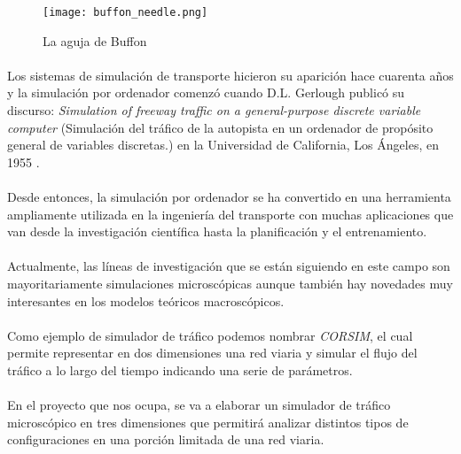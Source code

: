 	\begin{figure}[ht]
		\centering
			\texttt{[image: buffon\_needle.png]}
		\caption{La aguja de Buffon}
		\label{fig:AgujaBuffon}
	\end{figure}
	
	\paragraph{}	
	Los sistemas de simulación de transporte hicieron su aparición hace cuarenta años y la simulación por ordenador comenzó cuando D.L. Gerlough publicó su discurso: \emph{Simulation of freeway traffic on a general-purpose discrete variable computer} (Simulación del tráfico de la autopista en un ordenador de propósito general de variables discretas.) en la Universidad de California, Los Ángeles, en 1955 \cite{Kallberg1971}.
	
	\paragraph{}
	Desde entonces, la simulación por ordenador se ha convertido en una herramienta ampliamente utilizada en la ingeniería del transporte con muchas aplicaciones que van desde la investigación científica hasta la planificación y el entrenamiento.
	
	
	\paragraph{}
	Actualmente, las líneas de investigación que se están siguiendo en este campo son mayoritariamente simulaciones microscópicas aunque también hay novedades muy interesantes en los modelos teóricos macroscópicos.
	
	
	\paragraph{}
	Como ejemplo de simulador de tráfico podemos nombrar \emph{CORSIM}, el cual permite representar en dos dimensiones una red viaria y simular el flujo del tráfico a lo largo del tiempo indicando una serie de parámetros.
	
	
	\paragraph{}
	En el proyecto que nos ocupa, se va a elaborar un simulador de tráfico microscópico en tres dimensiones que permitirá analizar distintos tipos de configuraciones en una porción limitada de una red viaria.


